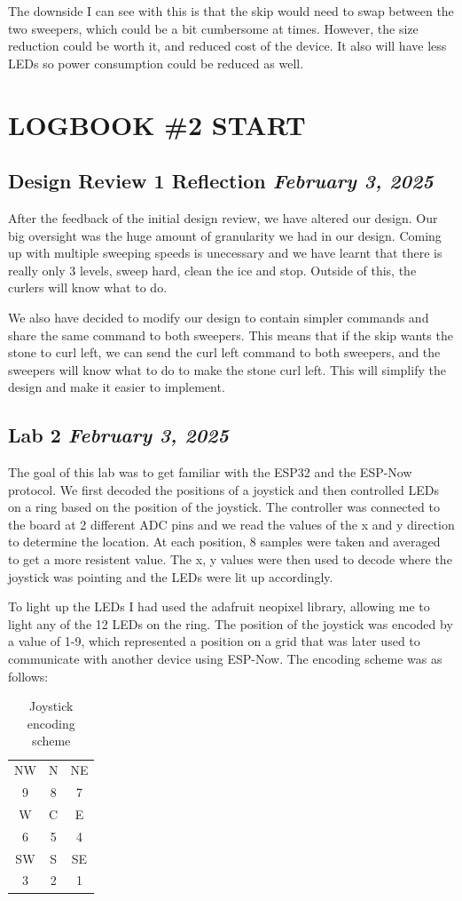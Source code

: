 \documentclass{article}
\newcommand{\logbookentry}[2]{
    \subsection*{#1 \hfill \textit{#2}} 
}
\begin{document}
The downside I can see with this is that the skip would need to swap between the two sweepers, which could be a bit cumbersome at times. However, the size reduction could be worth it, and reduced cost of the device. It also will have less LEDs so power consumption could be reduced as well.

\section{LOGBOOK \#2 START}
\logbookentry{Design Review 1 Reflection}{February 3, 2025}
After the feedback of the initial design review, we have altered our design. Our big oversight was the huge amount of granularity we had in our design. Coming up with multiple sweeping speeds is unecessary and we have learnt that there is really only 3 levels, sweep hard, clean the ice and stop. Outside of this, the curlers will know what to do.

We also have decided to modify our design to contain simpler commands and share the same command to both sweepers. This means that if the skip wants the stone to curl left, we can send the curl left command to both sweepers, and the sweepers will know what to do to make the stone curl left. This will simplify the design and make it easier to implement.

\logbookentry{Lab 2}{February 3, 2025}
The goal of this lab was to get familiar with the ESP32 and the ESP-Now protocol.
We first decoded the positions of a joystick and then controlled LEDs on a ring based on the position of the joystick. The controller was connected to the board at 2 different ADC pins and we read the values of the x and y direction to determine the location. At each position, 8 samples were taken and averaged to get a more resistent value. The x, y values were then used to decode where the joystick was pointing and the LEDs were lit up accordingly.

To light up the LEDs I had used the adafruit neopixel library, allowing me to light any of the 12 LEDs on the ring. The position of the joystick was encoded by a value of 1-9, which represented a position on a grid that was later used to communicate with another device using ESP-Now. The encoding scheme was as follows:
\begin{table}[ht!]
    \centering
    \begin{tabular}{|c|c|c|}
        \hline
        NW & N & NE \\
        9 & 8 & 7 \\
        \hline 
        W & C & E \\
        6 & 5 & 4 \\
        \hline
        SW & S & SE \\
        3 & 2 & 1 \\
        \hline
    \end{tabular}
    \caption{Joystick encoding scheme}
\end{table}
\end{document}
